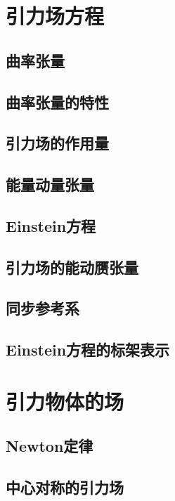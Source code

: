\chapter{引力场方程}

\section{曲率张量}

\section{曲率张量的特性}

\section{引力场的作用量}

\section{能量动量张量}

\section{Einstein方程}

\section{引力场的能动赝张量}

\section{同步参考系}

\section{Einstein方程的标架表示}

\chapter{引力物体的场}

\section{Newton定律}

\section{中心对称的引力场}

